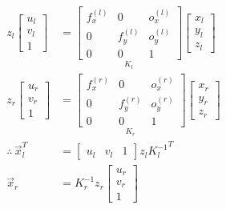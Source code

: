 \begin{align*}
    z_{l}
    \begin{bmatrix}
        u_{l} \\
        v_{l} \\
        1
    \end{bmatrix}&=\underset{K_l}{\begin{bmatrix}
        f_{x}^{(l)} & 0 & o_{x}^{(l)} \\
        0 & f_{y}^{(l)} & o_{y}^{(l)} \\
        0 & 0 & 1
    \end{bmatrix}}\begin{bmatrix}
        x_{l} \\
        y_{l} \\
        z_{l}
    \end{bmatrix}\\
    z_{r}
    \begin{bmatrix}
        u_{r} \\
        v_{r} \\
        1
    \end{bmatrix}&=\underset{K_r}{\begin{bmatrix}
        f_{x}^{(r)} & 0 & o_{x}^{(r)} \\
        0 & f_{y}^{(r)} & o_{y}^{(r)} \\
        0 & 0 & 1
    \end{bmatrix}}\begin{bmatrix}
        x_{r} \\
        y_{r} \\
        z_{r}
    \end{bmatrix}\\
    \therefore \,   \vec{x}_l^T&=\begin{bmatrix}
        u_l&v_l&1
    \end{bmatrix}z_l {K_l^{-1}}^T\\
    \vec{x}_r&=K_r^{-1} z_r \begin{bmatrix}
        u_{r} \\
        v_{r} \\
        1
    \end{bmatrix}
\end{align*}

